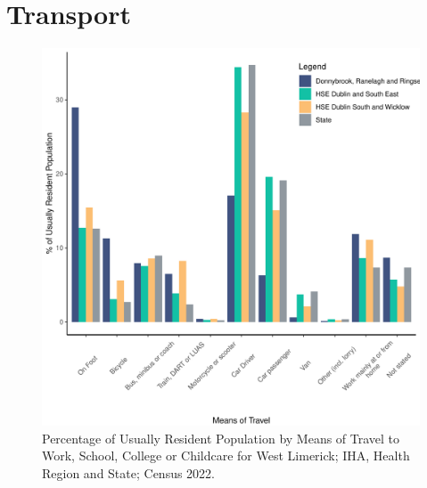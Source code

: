 \documentclass{article}
\begin{document}
\section{Transport}\label{sect:Trans}
\begin{figure}[H]
	\centering
	\includegraphics[width = 120mm]{../figures/TravelED.pdf}
	\caption{Percentage of Usually Resident Population by Means of Travel to Work, School, College or Childcare for West Limerick; IHA, Health Region and State; Census 2022.}
	\label{fig:vbnv}
	\end{figure}
\end{document}
